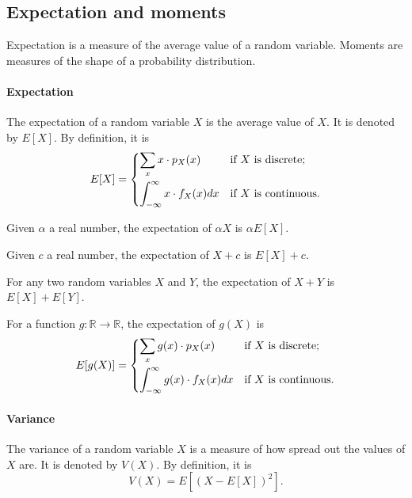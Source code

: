 \subsection{Expectation and moments}

Expectation is a measure of the average value of a random variable.  Moments are
measures of the shape of a probability distribution.

\paragraph{Expectation}  The expectation of a random variable $X$ is the average
value of $X$.  It is denoted by $E[X]$.  By definition, it is
\begin{equation}
  \label{eq:expectation}
  E[X] = \begin{dcases}
    \sum_{x} x \cdot p_X(x) & \text{if $X$ is discrete; } \\
    \int_{-\infty}^{\infty} x \cdot f_X(x) dx & \text{if $X$ is continuous.}
  \end{dcases}
\end{equation}

Given $\alpha$ a real number, the expectation of $\alpha X$ is $\alpha E[X]$.

Given $c$ a real number, the expectation of $X + c$ is $E[X] + c$.

For any two random variables $X$ and $Y$, the expectation of $X + Y$ is $E[X] + E[Y]$.

For a function $g : \mathbb{R} \rightarrow \mathbb{R}$, the expectation of $g(X)$ is
\begin{equation}
  \label{eq:egx}
  E[g(X)] = \begin{dcases}
    \sum_{x} g(x) \cdot p_X(x) & \text{if $X$ is discrete; } \\
    \int_{-\infty}^{\infty} g(x) \cdot f_X(x) dx & \text{if $X$ is continuous.}
  \end{dcases}
\end{equation}

\paragraph{Variance}  The variance of a random variable $X$ is a measure of how
spread out the values of $X$ are.  It is denoted by $V(X)$.  By definition, it is
\begin{equation}
  \label{eq:variance}
  V(X) = E\!\left[\left(X - E[X]\right)^2\right]\text{.}
\end{equation}


